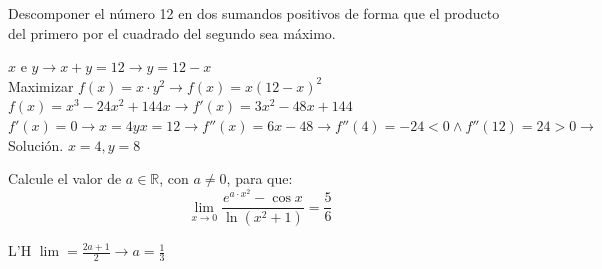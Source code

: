 \documentclass[addpoints,spanish, 12pt,a4paper]{exam}
\begin{document}
\begin{questions}
    

\question[2] Descomponer el número 12 en dos sumandos positivos de forma que el producto
del primero por el cuadrado del segundo sea máximo.
\begin{solution}
    $x$ e $y \to x+y =12 \to y=12-x$ \\
    Maximizar $f(x)=x\cdot y^2 \to f(x)=x\left(12-x\right)^2$ \\
    $f(x)=x^{3} - 24 x^{2} + 144 x \to f'(x)=3 x^{2} - 48 x + 144$ \\
    $f'(x)=0 \to x=4 y x=12 \to f''(x)=6x-48 \to f''(4)=-24<0 \land f''(12)=24>0 \to$ Solución. $x=4, y=8$
\end{solution}

\question[2] Calcule el valor de $a \in \mathbb{R}$, con $a\neq 0$, para que: $$\lim_{x \to 0}\dfrac{e^{a\cdot x^2}-\cos{x}}{\ln\left({x^2+1}\right)}=\frac{5}{6}$$
\begin{solution}
    L'H $\lim = \frac{2a+1}{2} \to a = \frac{1}{3}$
\end{solution}






\end{questions}
\end{document}
